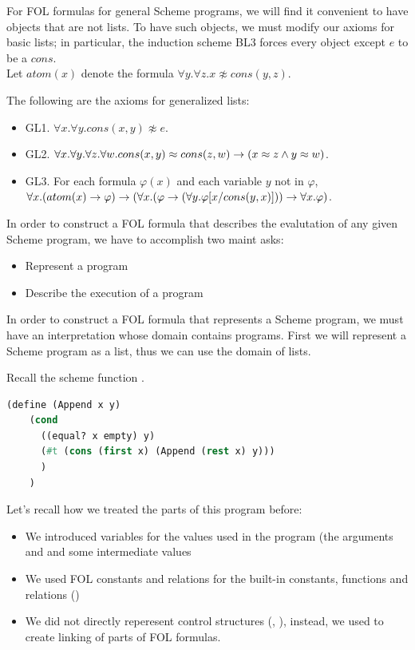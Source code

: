 \documentclass[english, 11pt]{article}
\begin{document}
  For FOL formulas for general Scheme programs, we will find it convenient to have objects that are not lists. To have such objects, we must modify our axioms for basic lists; in particular, the induction scheme BL3 forces every object except $e$ to be a $cons$. \\
  Let $atom(x)$ denote the formula $\forall y. \forall z. x \not \approx cons(y,z)$.

  The following are the axioms for generalized lists:

  \begin{itemize}
    \item GL1. $\forall x. \forall y. cons(x,y) \not \approx e$.
    \item GL2. $\forall x. \forall y. \forall z. \forall w. cons(x,y) \approx cons(z,w) \rightarrow (x \approx z \land y \approx w)$.
    \item GL3. For each formula $\varphi(x)$ and each variable $y$ not  in $\varphi$, $\forall x. (atom(x) \rightarrow \varphi) \rightarrow (\forall x. (\varphi \rightarrow (\forall y . \varphi[x/cons(y,x)])) \rightarrow \forall x. \varphi)$.
  \end{itemize}

  In order to construct a FOL formula that describes the evalutation of any given Scheme program, we have to accomplish two maint asks:
  \begin{itemize}
    \item Represent a program
    \item Describe the execution of a program
  \end{itemize}

  In order to construct a FOL formula that represents a Scheme program, we must have an interpretation whose domain contains programs. First we will represent a Scheme program as a list, thus we can use the domain of lists.

  Recall the scheme function .
  \begin{lstlisting}[language=lisp]
  (define (Append x y)
    (cond
      ((equal? x empty) y)
      (#t (cons (first x) (Append (rest x) y)))
      )
    )
  \end{lstlisting}

  Let's recall how we treated the parts of this program before:
  \begin{itemize}
    \item We introduced variables for the values used in the program (the arguments  and  and some intermediate values 
    \item We used FOL constants and relations for the built-in constants, functions and relations ()
    \item We did not directly reperesent control structures (, ), instead, we used  to create linking of parts of FOL formulas.
  \end{itemize}
\end{document}
